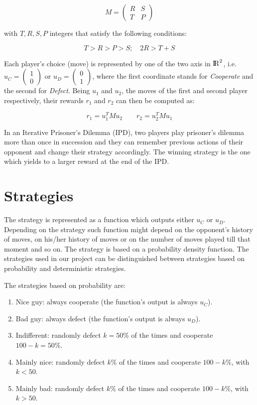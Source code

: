 \documentclass[journal,a4paper,10pt,twoside]{IEEEtran}
\begin{document}
$$
M = 
\begin{pmatrix} 
R & S \\
T & P 
\end{pmatrix}
$$

with $T,R,S,P$ integers that satisfy the following conditions:

$$
T>R>P>S; \quad 2R > T+S
$$

Each player's choice (move) is represented by one of the two axis in ${\rm I\!R}^2$, i.e. $u_C=\begin{pmatrix} 1 \\ 0 \end{pmatrix}$ or $u_D=\begin{pmatrix} 0 \\ 1 \end{pmatrix}$, where the first coordinate stands for \textit{Cooperate} and the second for \textit{Defect}. Being $u_1$ and $u_2$, the moves of the first and second player respectively, their rewards $r_1$ and $r_2$ can then be computed as:

$$
r_1 = u_1^T M u_2
\quad
\quad
r_2 = u_2^T M u_1
$$

In an Iterative Prisoner's Dilemma (IPD), two players play prisoner's dilemma more than once in succession and they can remember previous actions of their opponent and change their strategy accordingly. The winning strategy is the one which yields to a larger reward at the end of the IPD.

\section{Strategies}

The strategy is represented as a function which outputs either $u_C$ or $u_D$. Depending on the strategy such function might depend on the opponent's history of moves, on his/her history of moves or on the number of moves played till that moment and so on. The strategy is based on a probability density function. The strategies used in our project can be distinguished between strategies based on probability and deterministic strategies.

The strategies based on probability are:

\begin{enumerate}
    \item Nice guy: always cooperate (the function's output is always $u_C$).
    \item Bad guy: always defect (the function's output is always $u_D$).
    \item Indifferent: randomly defect $k=50\%$ of the times and cooperate $100-k=50\%$.
    \item Mainly nice: randomly defect $k\%$ of the times and cooperate $100-k\%$, with $k<50$.
    \item Mainly bad: randomly defect $k\%$ of the times and cooperate $100-k\%$, with $k>50$.
\end{enumerate}
\end{document}
